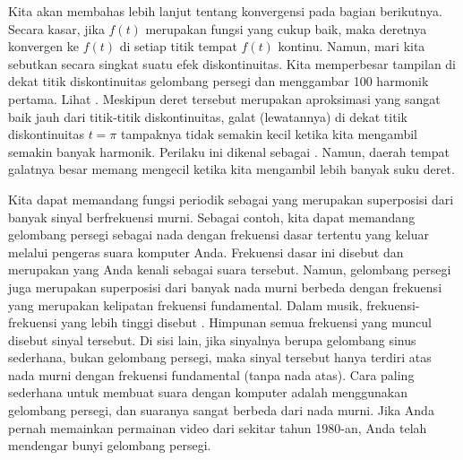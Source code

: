 Kita akan membahas lebih lanjut tentang konvergensi pada bagian berikutnya.
Secara kasar,
jika $f(t)$ merupakan fungsi yang cukup baik, maka deretnya
konvergen ke $f(t)$ di setiap titik tempat $f(t)$ kontinu.  Namun, mari kita
sebutkan secara singkat suatu efek diskontinuitas.
Kita memperbesar tampilan di dekat titik diskontinuitas gelombang persegi
dan menggambar 100 harmonik pertama.  Lihat
.  Meskipun
deret tersebut merupakan aproksimasi yang sangat baik jauh dari titik-titik diskontinuitas, galat
(lewatannya)
di dekat titik diskontinuitas $t=\pi$ tampaknya tidak semakin kecil
ketika kita mengambil semakin banyak harmonik.
Perilaku ini dikenal sebagai \emph{}.
Namun, daerah tempat galatnya besar memang mengecil ketika
kita mengambil lebih banyak suku deret.

\begin{myfig}
\capstart
{}
\caption{Fenomena Gibbs sedang terjadi.\label{ts:squarewavegibbsfig}}
\end{myfig}

\medskip

Kita dapat memandang fungsi periodik sebagai 
yang merupakan superposisi dari
banyak sinyal berfrekuensi murni.
Sebagai contoh, kita dapat memandang gelombang
persegi sebagai nada dengan frekuensi dasar tertentu
yang keluar melalui pengeras suara komputer Anda.
Frekuensi dasar ini disebut
\emph{}
dan merupakan  yang Anda kenali sebagai suara tersebut.
Namun, gelombang persegi juga merupakan
superposisi dari
banyak nada murni berbeda dengan frekuensi yang merupakan kelipatan
frekuensi fundamental.
Dalam musik,
frekuensi-frekuensi yang lebih tinggi disebut \emph{}.
Himpunan semua frekuensi yang muncul disebut
\emph{} sinyal tersebut.
Di sisi lain,
jika sinyalnya berupa
gelombang sinus sederhana, bukan gelombang persegi,
maka sinyal tersebut hanya terdiri atas nada murni dengan
frekuensi fundamental (tanpa nada atas).
Cara paling sederhana untuk membuat suara dengan komputer adalah menggunakan gelombang persegi,
dan suaranya sangat berbeda dari nada murni.
Jika Anda pernah memainkan permainan video
dari sekitar tahun 1980-an, Anda telah mendengar bunyi gelombang persegi.

